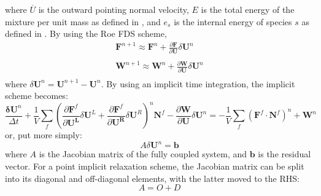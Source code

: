 where $\overline{U}$ is the outward pointing normal velocity, $E$ is
the total energy of the mixture per unit mass as defined in
, and $e_s$ is the internal energy of species $s$ as
defined in .  By using the Roe FDS scheme,
\begin{equation}
	\begin{matrix}
		\mathbf{F}^{n+1} \approx \mathbf{F}^n+\frac{\partial \mathbf{F}}{\partial \mathbf{U}}\delta\mathbf{U}^n \\
		\\
		\mathbf{W}^{n+1} \approx \mathbf{W}^n+\frac{\partial \mathbf{W}}{\partial \mathbf{U}}\delta\mathbf{U}^n \\
	\end{matrix}
\end{equation}
where $\delta\mathbf{U}^n = \mathbf{U}^{n+1}- \mathbf{U}^{n}$.  By using an
implicit time integration, the implicit scheme becomes:
\begin{equation}
	\frac{\mathbf{\delta U}^n}{\Delta t}+\frac{1}{V}\sum\limits_{f}(\frac{\partial \mathbf{F}^f}{\partial \mathbf{U^L}}\delta\mathbf{U}^L
	+\frac{\partial \mathbf{F}^f}{\partial \mathbf{U^R}}\delta\mathbf{U}^R)^n \mathbf{N}^f
	- \frac{\partial \mathbf{W}}{\partial \mathbf{U}}\delta\mathbf{U}^n
	= -\frac{1}{V}\sum\limits_{f}(\mathbf{F}^f\cdot\mathbf{N}^f)^n + \mathbf{W}^n
\end {equation}
or, put more simply:
\begin{equation}
	A\delta\mathbf{U}^n = \mathbf{b}
\end{equation}
where $A$ is the Jacobian matrix of the fully coupled system, and $\mathbf{b}$
is the residual vector.  For a point implicit relaxation scheme, the Jacobian
matrix can be split into its diagonal and off-diagonal elements, with the latter
moved to the RHS:
\begin{equation}
\label{decomp_jac}
	A=O+D
\end{equation}
